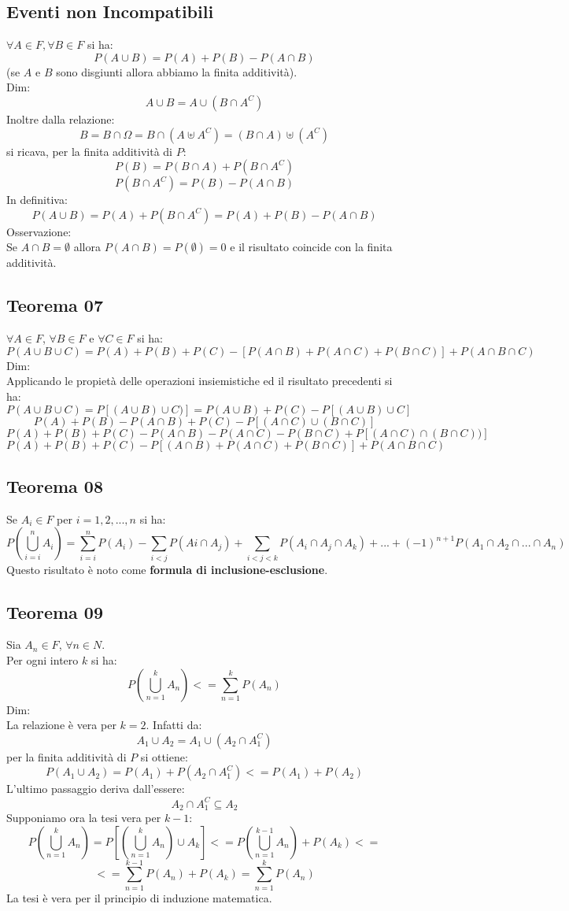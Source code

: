 \subsection{Eventi non Incompatibili}
$ \forall A \in F, \forall B \in F $ si ha:
$$ P(A \cup B) = P(A) + P(B) - P(A \cap B)$$
(se $A$ e $B$ sono disgiunti allora abbiamo la finita additività).\\
Dim: 
$$ A \cup B = A \cup (B \cap A^C) $$
Inoltre dalla relazione:
$$ B=B \cap \Omega = B \cap (A \uplus A^C) = (B \cap A) \uplus (A^C)$$
si ricava, per la finita additività di $P$:
$$ P(B) = P(B \cap A) + P(B \cap A^C)$$
$$ P(B \cap A^C) = P(B) - P(A \cap B)$$
In definitiva:
$$ P(A \cup B) = P(A) + P(B \cap A^C) = P(A) + P(B) - P(A \cap B)$$
Osservazione:\\
Se $A \cap B = \emptyset$ allora $P(A \cap B) = P(\emptyset) = 0$ e il risultato coincide con la finita additività.

\subsection{Teorema 07}
$\forall A \in F$, $\forall B \in F$ e $\forall C \in F$ si ha:
$$ P(A \cup B \cup C) = P(A) + P(B) + P(C) - [P(A \cap B) + P(A \cap C) + P(B \cap C)] + P(A \cap B \cap C)$$
Dim: \\
Applicando le propietà delle operazioni insiemistiche ed il risultato precedenti si ha:
$$ P(A \cup B \cup C) = P[(A \cup B) \cup C)] = P(A \cup B) + P(C) - P[(A \cup B) \cup C]$$
$$ P(A) + P(B) - P(A \cap B) + P(C) - P[(A \cap C) \cup (B \cap C)]$$
$$ P(A) + P(B) + P(C) - P(A \cap B) - P(A \cap C) - P(B \cap C) + P[(A \cap C) \cap (B \cap C))]$$
$$ P(A) + P(B) +P(C) - P[(A \cap B) + P (A \cap C) + P(B \cap C)] + P(A \cap B \cap C)$$

\subsection{Teorema 08}
Se $A_i \in F$ per $i = 1,2,...,n$ si ha:
$$ P(\bigcup_{i=i}^n A_i) = \sum_{i=i}^n P(A_i) - \sum_{i<j} P(Ai \cap A_j) + \sum_{i<j<k} P(A_i \cap A_j \cap A_k) +...+ (-1)^{n+1} P(A_1 \cap A_2 \cap ... \cap A_n)$$
Questo risultato è noto come \textbf{formula di inclusione-esclusione}.

\subsection{Teorema 09}
Sia $A_n \in F$, $\forall n \in N$.\\
Per ogni intero $k$ si ha:
$$ P(\bigcup_{n=1}^k A_n) <= \sum_{n=1}^k P(A_n) $$
Dim:\\
La relazione è vera per $k=2$. Infatti da:
$$ A_1 \cup A_2 = A_1 \cup (A_2 \cap A_1^C) $$
per la finita additività di $P$ si ottiene:
$$ P(A_1 \cup A_2) = P(A_1) + P(A_2 \cap A_1^C) <= P(A_1) + P(A_2) $$
L'ultimo passaggio deriva dall'essere:
$$ A_2 \cap A_1^C \subseteq A_2 $$
Supponiamo ora la tesi vera per $k-1$:
$$ P(\bigcup_{n=1}^k A_n) = P[(\bigcup_{n=1}^k A_n) \cup A_k ] <= P(\bigcup_{n=1}^{k-1} A_n)+P(A_k) <= $$
$$ <= \sum_{n=1}^{k-1} P(A_n) + P(A_k) = \sum_{n=1}^k P(A_n)$$
La tesi è vera per il principio di induzione matematica.

